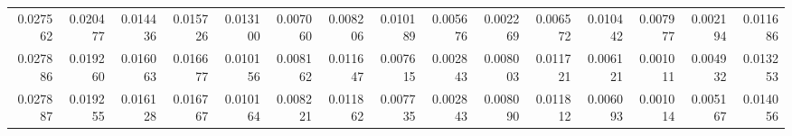 \begin{tabular}{rrrrrrrrrrrrrrr}
0.027562 & 0.020477 & 0.014436 & 0.015726 & 0.013100 & 0.007060 & 0.008206 & 0.010189 & 0.005676 & 0.002269 & 0.006572 & 0.010442 & 0.007977 & 0.002194 & 0.011686 \\
0.027886 & 0.019260 & 0.016063 & 0.016677 & 0.010156 & 0.008162 & 0.011647 & 0.007615 & 0.002843 & 0.008003 & 0.011721 & 0.006121 & 0.001011 & 0.004932 & 0.013253 \\
0.027887 & 0.019255 & 0.016128 & 0.016767 & 0.010164 & 0.008221 & 0.011862 & 0.007735 & 0.002843 & 0.008090 & 0.011812 & 0.006093 & 0.001014 & 0.005167 & 0.014056 \\
\bottomrule
\end{tabular}
